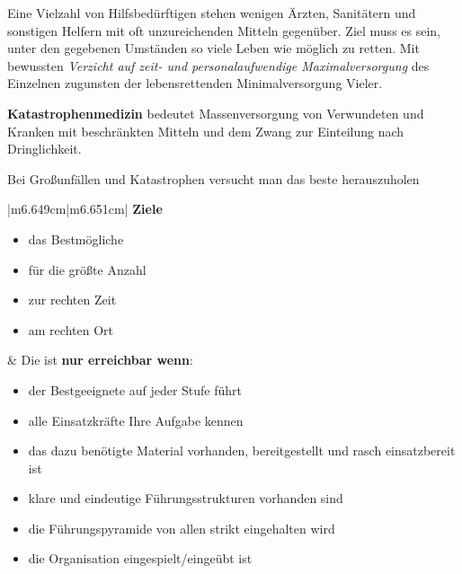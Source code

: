 \documentclass{article}
\newcommand\gEs[1]{\textbf{\textcolor[rgb]{0.0,0.0,0.5019608}{#1}}}
\newcommand\gEs[1]{\textbf{\textcolor[rgb]{0.0,0.0,0.5019608}{#1}}}
\newcommand\gT[1]{\textbf{\textup{\textcolor[rgb]{0.0,0.5019608,0.0}{#1}}}}
\newcommand\gE[1]{\textit{#1}}
\newcommand\gNw[1]{#1}
\begin{document}
{\mdseries
Eine Vielzahl von Hilfsbed\"urftigen stehen wenigen \"Arzten,
Sanit\"atern und sonstigen Helfern mit oft unzureichenden Mitteln
gegen\"uber. Ziel muss es sein, unter den gegebenen Umst\"anden so
viele Leben wie m\"oglich zu retten. Mit bewussten
\gE{Verzicht auf zeit- und personalaufwendige
Maximalversorgung} des Einzelnen zugunsten der lebensrettenden
Minimalversorgung Vieler.}

{\mdseries
\gT{Katastrophenmedizin} bedeutet Massenversorgung von
Verwundeten und Kranken mit beschr\"ankten Mitteln und dem Zwang zur
Einteilung nach Dringlichkeit.}

{\mdseries\color{black}
\gNw{Bei Gro{\ss}unf\"allen und Katastrophen versucht man das
beste herauszuholen}}

\begin{center}
\tablehead{}\begin{supertabular}{|m{6.649cm}|m{6.651cm}|}
\hline
{\mdseries\color{black} \gEs{Ziele}}

\begin{itemize}
\item {\mdseries das Bestm\"ogliche}

\item {\mdseries f\"ur die gr\"o{\ss}te Anzahl}

\item {\mdseries zur rechten Zeit}

\item {\mdseries am rechten Ort}

\end{itemize}
 &
{\mdseries Die ist \gEs{nur erreichbar wenn}:}

\begin{itemize}
\item {\mdseries der Bestgeeignete auf jeder Stufe f\"uhrt}

\item {\mdseries alle Einsatzkr\"afte Ihre Aufgabe kennen }

\item {\mdseries das dazu ben\"otigte Material vorhanden, bereitgestellt
und rasch einsatzbereit ist}

\item {\mdseries klare und eindeutige F\"uhrungsstrukturen vorhanden
sind}

\item {\mdseries die F\"uhrungspyramide von allen strikt eingehalten
wird}

\item {\mdseries die Organisation eingespielt/einge\"ubt ist}


\end{itemize}
\end{supertabular}
\end{center}
\end{document}
